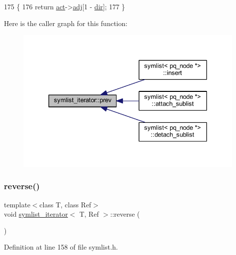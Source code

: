 \begin{DoxyCode}
175     \{
176     \textcolor{keywordflow}{return} \mbox{\hyperlink{structsymlist__iterator_a1c7a0193ab85baa7705070975d841fc8}{act}}->\mbox{\hyperlink{structsymnode_aba7e8f525fb4d85417384a6ccff59241}{adj}}[1 - \mbox{\hyperlink{structsymlist__iterator_a8433e558ceb6b17b225414ef46b4a3e2}{dir}}];
177     \}
\end{DoxyCode}
Here is the caller graph for this function\+:\nopagebreak
\begin{figure}[H]
\begin{center}
\leavevmode
\includegraphics[width=330pt]{structsymlist__iterator_a30f1c0a962713ded0c24871093089fb0_icgraph}
\end{center}
\end{figure}
\mbox{\label{structsymlist__iterator_a4135864290fda971467e41869b20e904}} 
\subsubsection{\texorpdfstring{reverse()}{reverse()}}
{\footnotesize\ttfamily template$<$class T, class Ref$>$ \\
void \mbox{\hyperlink{structsymlist__iterator}{symlist\+\_\+iterator}}$<$ T, Ref $>$\+::reverse (\begin{DoxyParamCaption}{ }\end{DoxyParamCaption})\hspace{0.3cm}{\ttfamily [inline]}}



Definition at line 158 of file symlist.\+h.


